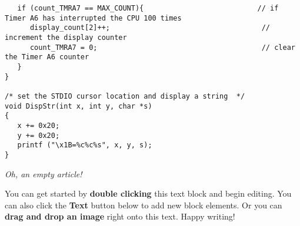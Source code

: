 \begin{lstlisting}
   if (count_TMRA7 == MAX_COUNT){                           // if Timer A6 has interrupted the CPU 100 times
      display_count[2]++;                                    // increment the display counter
      count_TMRA7 = 0;                                       // clear the Timer A6 counter
   }
}

/* set the STDIO cursor location and display a string  */
void DispStr(int x, int y, char *s)
{
   x += 0x20;
   y += 0x20;
   printf ("\x1B=%c%c%s", x, y, s);
}
\end{lstlisting}

\textit{Oh, an empty article!} 

You can get started by \textbf{double clicking} this text block and begin editing. You can also click the \textbf{Text} button below to add new block elements. Or you can \textbf{drag and drop an image} right onto this text. Happy writing!
